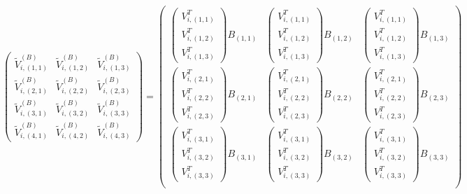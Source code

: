 $$
	\begin{pmatrix}
		\widetilde{V}_{i,(1,1)}^{(B)} & \widetilde{V}_{i,(1,2)}^{(B)} & \widetilde{V}_{i,(1,3)}^{(B)} \\
		\widetilde{V}_{i,(2,1)}^{(B)} & \widetilde{V}_{i,(2,2)}^{(B)} & \widetilde{V}_{i,(2,3)}^{(B)} \\
		\widetilde{V}_{i,(3,1)}^{(B)} & \widetilde{V}_{i,(3,2)}^{(B)} & \widetilde{V}_{i,(3,3)}^{(B)} \\
		\widetilde{V}_{i,(4,1)}^{(B)} & \widetilde{V}_{i,(4,2)}^{(B)} & \widetilde{V}_{i,(4,3)}^{(B)}
	\end{pmatrix}
	=
	\begin{pmatrix}
		\begin{pmatrix} V_{i,(1,1)}^T \\ V_{i,(1,2)}^T \\ V_{i,(1,3)}^T \end{pmatrix} B_{(1,1)} & \begin{pmatrix} V_{i,(1,1)}^T \\ V_{i,(1,2)}^T \\ V_{i,(1,3)}^T \end{pmatrix} B_{(1,2)} & \begin{pmatrix} V_{i,(1,1)}^T \\ V_{i,(1,2)}^T \\ V_{i,(1,3)}^T \end{pmatrix} B_{(1,3)} \\
		\begin{pmatrix} V_{i,(2,1)}^T \\ V_{i,(2,2)}^T \\ V_{i,(2,3)}^T \end{pmatrix} B_{(2,1)} & \begin{pmatrix} V_{i,(2,1)}^T \\ V_{i,(2,2)}^T \\ V_{i,(2,3)}^T \end{pmatrix} B_{(2,2)} & \begin{pmatrix} V_{i,(2,1)}^T \\ V_{i,(2,2)}^T \\ V_{i,(2,3)}^T \end{pmatrix} B_{(2,3)} \\
		\begin{pmatrix} V_{i,(3,1)}^T \\ V_{i,(3,2)}^T \\ V_{i,(3,3)}^T \end{pmatrix} B_{(3,1)} & \begin{pmatrix} V_{i,(3,1)}^T \\ V_{i,(3,2)}^T \\ V_{i,(3,3)}^T \end{pmatrix} B_{(3,2)} & \begin{pmatrix} V_{i,(3,1)}^T \\ V_{i,(3,2)}^T \\ V_{i,(3,3)}^T \end{pmatrix} B_{(3,3)} \\

\end{pmatrix}$$
